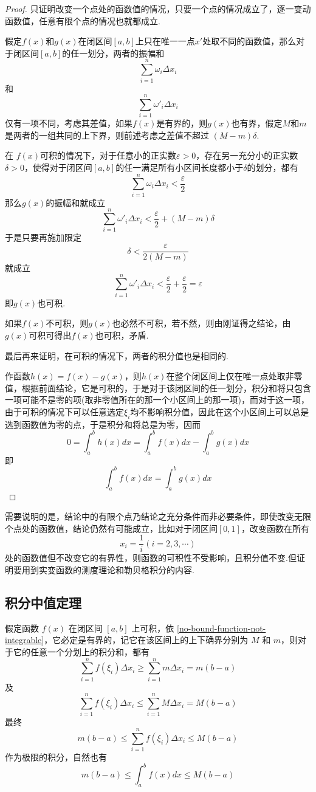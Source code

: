 \begin{proof}
  只证明改变一个点处的函数值的情况，只要一个点的情况成立了，逐一变动函数值，任意有限个点的情况也就都成立.

  假定$f(x)$和$g(x)$在闭区间$[a,b]$上只在唯一一点$x'$处取不同的函数值，那么对于闭区间$[a,b]$的任一划分，两者的振幅和
  \[ \sum_{i=1}^n \omega_i \Delta x_i \]
  和
  \[ \sum_{i=1}^n \omega'_i \Delta x_i \]
  仅有一项不同，考虑其差值，如果$f(x)$是有界的，则$g(x)$也有界，假定$M$和$m$是两者的一组共同的上下界，则前述考虑之差值不超过 $(M-m)\delta$.

  在 $f(x)$可积的情况下，对于任意小的正实数$\varepsilon>0$，存在另一充分小的正实数$\delta>0$，使得对于闭区间$[a,b]$的任一满足所有小区间长度都小于$\delta$的划分，都有
  \[ \sum_{i=1}^n \omega_i \Delta x_i < \frac{\varepsilon}{2} \]
 那么$g(x)$的振幅和就成立 
  \[ \sum_{i=1}^n \omega'_i \Delta x_i < \frac{\varepsilon}{2}+(M-m)\delta \]
  于是只要再施加限定
  \[ \delta < \frac{\varepsilon}{2(M-m)} \]
  就成立
  \[ \sum_{i=1}^n \omega'_i \Delta x_i < \frac{\varepsilon}{2}+\frac{\varepsilon}{2} = \varepsilon \]
  即$g(x)$也可积.

  如果$f(x)$不可积，则$g(x)$也必然不可积，若不然，则由刚证得之结论，由$g(x)$可积可得出$f(x)$也可积，矛盾.

  最后再来证明，在可积的情况下，两者的积分值也是相同的.

  作函数$h(x)=f(x)-g(x)$，则$h(x)$在整个闭区间上仅在唯一点处取非零值，根据前面结论，它是可积的，于是对于该闭区间的任一划分，积分和将只包含一项可能不是零的项(取非零值所在的那一个小区间上的那一项)，而对于这一项，由于可积的情况下可以任意选定$\xi_i$均不影响积分值，因此在这个小区间上可以总是选到函数值为零的点，于是积分和将总是为零，因而
  \[ 0 = \int_a^{b} h(x)dx = \int_{a}^{b}f(x)dx - \int_a^{b} g(x)dx \]
  即
  \[ \int_{a}^{b}f(x)dx = \int_a^{b} g(x)dx  \]
\end{proof}

需要说明的是，结论中的有限个点乃结论之充分条件而非必要条件，即使改变无限个点处的函数值，结论仍然有可能成立，比如对于闭区间$[0,1]$，改变函数在所有
\[ x_i=\frac{1}{i}(i=2,3,\cdots) \]
处的函数值但不改变它的有界性，则函数的可积性不受影响，且积分值不变.但证明要用到实变函数的测度理论和勒贝格积分的内容.

\subsection{积分中值定理}
\label{sec:integral-midvalue-theoream}

假定函数 $f(x)$ 在闭区间 $[a,b]$ 上可积，依 \autoref{no-bound-function-not-integrable}，它必定是有界的，记它在该区间上的上下确界分别为 $M$ 和 $m$，则对于它的任意一个分划上的积分和，都有
\[ \sum_{i=1}^nf(\xi_i)\Delta x_i \geqslant \sum_{i=1}^n m\Delta x_i = m(b-a) \]
及
\[ \sum_{i=1}^nf(\xi_i)\Delta x_i \leqslant \sum_{i=1}^n M\Delta x_i = M(b-a) \]
最终
\[ m(b-a) \leqslant \sum_{i=1}^nf(\xi_i)\Delta x_i \leqslant  M(b-a) \]
作为极限的积分，自然也有
\[ m(b-a) \leqslant \int_a^{b} f(x) dx \leqslant M(b-a) \]

